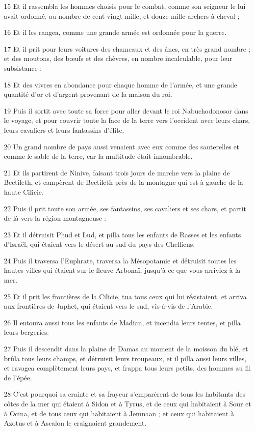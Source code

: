 \par 15 Et il rassembla les hommes choisis pour le combat, comme son seigneur le lui avait ordonné, au nombre de cent vingt mille, et douze mille archers à cheval ;
\par 16 Et il les rangea, comme une grande armée est ordonnée pour la guerre.
\par 17 Et il prit pour leurs voitures des chameaux et des ânes, en très grand nombre ; et des moutons, des bœufs et des chèvres, en nombre incalculable, pour leur subsistance :
\par 18 Et des vivres en abondance pour chaque homme de l'armée, et une grande quantité d'or et d'argent provenant de la maison du roi.
\par 19 Puis il sortit avec toute sa force pour aller devant le roi Nabuchodonosor dans le voyage, et pour couvrir toute la face de la terre vers l'occident avec leurs chars, leurs cavaliers et leurs fantassins d'élite.
\par 20 Un grand nombre de pays aussi venaient avec eux comme des sauterelles et comme le sable de la terre, car la multitude était innombrable.
\par 21 Et ils partirent de Ninive, faisant trois jours de marche vers la plaine de Bectileth, et campèrent de Bectileth près de la montagne qui est à gauche de la haute Cilicie.
\par 22 Puis il prit toute son armée, ses fantassins, ses cavaliers et ses chars, et partit de là vers la région montagneuse ;
\par 23 Et il détruisit Phud et Lud, et pilla tous les enfants de Rasses et les enfants d'Israël, qui étaient vers le désert au sud du pays des Chelliens.
\par 24 Puis il traversa l'Euphrate, traversa la Mésopotamie et détruisit toutes les hautes villes qui étaient sur le fleuve Arbonaï, jusqu'à ce que vous arriviez à la mer.
\par 25 Et il prit les frontières de la Cilicie, tua tous ceux qui lui résistaient, et arriva aux frontières de Japhet, qui étaient vers le sud, vis-à-vis de l'Arabie.
\par 26 Il entoura aussi tous les enfants de Madian, et incendia leurs tentes, et pilla leurs bergeries.
\par 27 Puis il descendit dans la plaine de Damas au moment de la moisson du blé, et brûla tous leurs champs, et détruisit leurs troupeaux, et il pilla aussi leurs villes, et ravagea complètement leurs pays, et frappa tous leurs petits. des hommes au fil de l'épée.
\par 28 C'est pourquoi sa crainte et sa frayeur s'emparèrent de tous les habitants des côtes de la mer qui étaient à Sidon et à Tyrus, et de ceux qui habitaient à Sour et à Ocina, et de tous ceux qui habitaient à Jemnaan ; et ceux qui habitaient à Azotus et à Ascalon le craignaient grandement.

